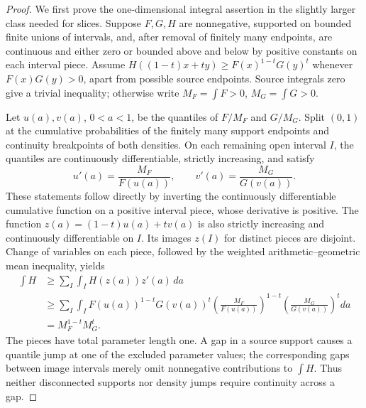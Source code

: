 \begin{proof}
We first prove the one-dimensional integral assertion in the slightly
larger class needed for slices.  Suppose $F,G,H$ are nonnegative,
supported on bounded finite unions of intervals, and, after removal of
finitely many endpoints, are continuous and either zero or bounded
above and below by positive constants on each interval piece.  Assume
$H((1-t)x+ty)\ge F(x)^{1-t}G(y)^t$ whenever $F(x)G(y)>0$, apart from
possible source endpoints.  Source integrals zero give a trivial
inequality; otherwise write $M_F=\int F>0$, $M_G=\int G>0$.

Let $u(a),v(a)$, $0<a<1$, be the quantiles of $F/M_F$ and $G/M_G$.
Split $(0,1)$ at the cumulative probabilities of the finitely many
support endpoints and continuity breakpoints of both densities.  On
each remaining open interval $I$, the quantiles are continuously
differentiable, strictly increasing, and satisfy
\[
 u'(a)=\frac{M_F}{F(u(a))},\qquad
 v'(a)=\frac{M_G}{G(v(a))}.
\]
These statements follow directly by inverting the continuously
differentiable cumulative function on a positive interval piece, whose
derivative is positive.  The function
$z(a)=(1-t)u(a)+tv(a)$ is also strictly increasing and continuously
differentiable on $I$.  Its images $z(I)$ for distinct pieces are
disjoint.  Change of variables on each piece, followed by the weighted
arithmetic--geometric mean inequality, yields
\begin{align*}
 \int H
 &\ge\sum_I\int_I H(z(a))z'(a)\,da\\
 &\ge\sum_I\int_I
 F(u(a))^{1-t}G(v(a))^t
 \left(\frac{M_F}{F(u(a))}\right)^{1-t}
 \left(\frac{M_G}{G(v(a))}\right)^t da\\
 &=M_F^{1-t}M_G^t.
\end{align*}
The pieces have total parameter length one.  A gap in a source support
causes a quantile jump at one of the excluded parameter values; the
corresponding gaps between image intervals merely omit nonnegative
contributions to $\int H$.  Thus neither disconnected supports nor
density jumps require continuity across a gap.


\end{proof}
